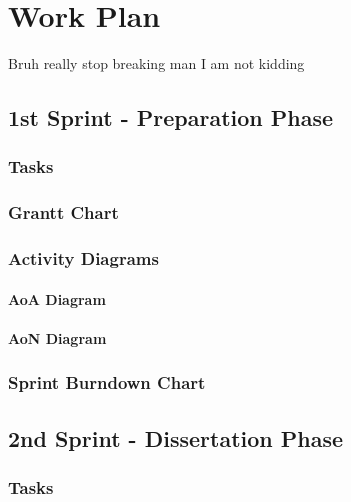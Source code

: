 
%

\chapter{Work Plan}
\label{cha:work_plan}

Bruh really stop breaking man I am not kidding

\section{1st Sprint - Preparation Phase}

\subsection{Tasks}

\subsection{Grantt Chart}

\subsection{Activity Diagrams}

\subsubsection{AoA Diagram}

\subsubsection{AoN Diagram}

\subsection{Sprint Burndown Chart}

\section{2nd Sprint - Dissertation Phase}

\subsection{Tasks}

